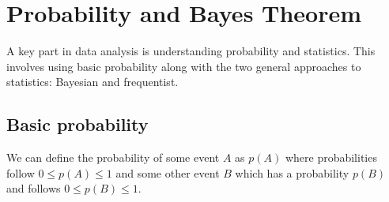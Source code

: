 \section{\label{intro:prob}Probability and Bayes Theorem}

A key part in data analysis is understanding probability and statistics. 
This involves using basic probability along with the two general approaches to statistics: Bayesian and frequentist. 

\subsection{\label{intro:prob:basic}Basic probability}

We can define the probability of some event $A$ as $p(A)$ where probabilities follow $0 \leq p(A) \leq 1$ and some other event $B$ which has a probability $p(B)$ and follows $0 \leq p(B) \leq 1$.


